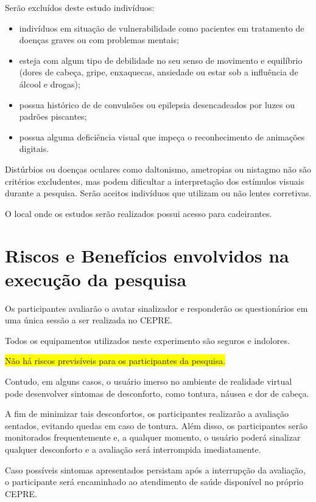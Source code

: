 \documentclass[a4paper,11pt,titlepage,singlespacing]{article}
\begin{document}
Serão excluídos deste estudo indivíduos:

\begin{itemize}
\item indivíduos em situação de vulnerabilidade como pacientes em tratamento de doenças graves ou com problemas mentais;
\item esteja com algum tipo de debilidade no seu senso de movimento e equilíbrio (dores de cabeça, gripe, enxaquecas, ansiedade ou estar sob a influência de álcool e drogas);
\item possua histórico de de convulsões ou epilepsia desencadeados por luzes ou padrões piscantes;
\item possua alguma deficiência visual que impeça o reconhecimento de animações digitais.
\end{itemize}

Distúrbios ou doenças oculares como daltonismo, ametropias ou nistagmo não são critérios excludentes, mas podem dificultar a interpretação dos estímulos visuais durante a pesquisa. Serão aceitos indivíduos que utilizam ou não lentes corretivas. 

O local onde os estudos serão realizados possui acesso para cadeirantes.

\section{Riscos e Benefícios envolvidos na execução da pesquisa}
Os participantes avaliarão o avatar sinalizador e responderão os questionários em uma única sessão a ser realizada no CEPRE.

Todos os equipamentos utilizados neste experimento são seguros e indolores. 

\colorbox{yellow}{Não há riscos previsíveis para os participantes da pesquisa.} 

Contudo, em alguns casos, o usuário imerso no ambiente de realidade virtual pode desenvolver sintomas de desconforto, como tontura, náusea e dor de cabeça. 

A fim de minimizar tais desconfortos, os participantes realizarão a avaliação sentados, evitando quedas em caso de tontura. Além disso, os participantes serão monitorados frequentemente e, a qualquer momento, o usuário poderá sinalizar qualquer desconforto e a avaliação será interrompida imediatamente. 

Caso possíveis sintomas apresentados persistam após a interrupção da avaliação, o participante será encaminhado ao atendimento de saúde disponível no próprio CEPRE.
\end{document}

